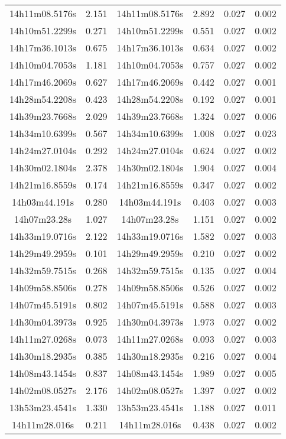 \begin{table}
\begin{tabular}{cccccc}
14h11m08.5176s & 2.151 & 14h11m08.5176s & 2.892 & 0.027 & 0.002 \\
14h10m51.2299s & 0.271 & 14h10m51.2299s & 0.551 & 0.027 & 0.002 \\
14h17m36.1013s & 0.675 & 14h17m36.1013s & 0.634 & 0.027 & 0.002 \\
14h10m04.7053s & 1.181 & 14h10m04.7053s & 0.757 & 0.027 & 0.002 \\
14h17m46.2069s & 0.627 & 14h17m46.2069s & 0.442 & 0.027 & 0.001 \\
14h28m54.2208s & 0.423 & 14h28m54.2208s & 0.192 & 0.027 & 0.001 \\
14h39m23.7668s & 2.029 & 14h39m23.7668s & 1.324 & 0.027 & 0.006 \\
14h34m10.6399s & 0.567 & 14h34m10.6399s & 1.008 & 0.027 & 0.023 \\
14h24m27.0104s & 0.292 & 14h24m27.0104s & 0.624 & 0.027 & 0.002 \\
14h30m02.1804s & 2.378 & 14h30m02.1804s & 1.904 & 0.027 & 0.004 \\
14h21m16.8559s & 0.174 & 14h21m16.8559s & 0.347 & 0.027 & 0.002 \\
14h03m44.191s & 0.280 & 14h03m44.191s & 0.403 & 0.027 & 0.003 \\
14h07m23.28s & 1.027 & 14h07m23.28s & 1.151 & 0.027 & 0.002 \\
14h33m19.0716s & 2.122 & 14h33m19.0716s & 1.582 & 0.027 & 0.003 \\
14h29m49.2959s & 0.101 & 14h29m49.2959s & 0.210 & 0.027 & 0.002 \\
14h32m59.7515s & 0.268 & 14h32m59.7515s & 0.135 & 0.027 & 0.004 \\
14h09m58.8506s & 0.278 & 14h09m58.8506s & 0.526 & 0.027 & 0.002 \\
14h07m45.5191s & 0.802 & 14h07m45.5191s & 0.588 & 0.027 & 0.003 \\
14h30m04.3973s & 0.925 & 14h30m04.3973s & 1.973 & 0.027 & 0.002 \\
14h11m27.0268s & 0.073 & 14h11m27.0268s & 0.093 & 0.027 & 0.003 \\
14h30m18.2935s & 0.385 & 14h30m18.2935s & 0.216 & 0.027 & 0.004 \\
14h08m43.1454s & 0.837 & 14h08m43.1454s & 1.989 & 0.027 & 0.005 \\
14h02m08.0527s & 2.176 & 14h02m08.0527s & 1.397 & 0.027 & 0.002 \\
13h53m23.4541s & 1.330 & 13h53m23.4541s & 1.188 & 0.027 & 0.011 \\
14h11m28.016s & 0.211 & 14h11m28.016s & 0.438 & 0.027 & 0.002 \\

\end{tabular}
\end{table}
